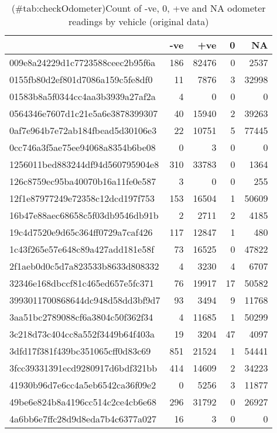 \documentclass[]{article}
\begin{document}
\begin{table}[t]

\caption{(\#tab:checkOdometer)Count of -ve, 0, +ve and NA odometer readings by vehicle (original data)}
\centering
\begin{tabular}{l|r|r|r|r}
\hline
  & -ve & +ve & 0 & NA\\
\hline
009e8a24229d1c7723588ceec2b95f6a & 186 & 82476 & 0 & 2537\\
\hline
0155fb80d2ef801d7086a159c5fe8df0 & 11 & 7876 & 3 & 32998\\
\hline
01583b8a5f0344cc4aa3b3939a27af2a & 4 & 0 & 0 & 0\\
\hline
0564346e7607d1c21e5a6e3878399307 & 40 & 15940 & 2 & 39263\\
\hline
0af7e964b7e72ab184fbead5d30106e3 & 22 & 10751 & 5 & 77445\\
\hline
0cc746a3f5ae75ee94068a8354b6be08 & 0 & 3 & 0 & 0\\
\hline
1256011bed883244df94d560795904e8 & 310 & 33783 & 0 & 1364\\
\hline
126c8759ec95ba40070b16a11fe0e587 & 3 & 0 & 0 & 255\\
\hline
12f1e87977249e72358c12dcd197f753 & 153 & 16504 & 1 & 50609\\
\hline
16b47e88aec68658c5f03db9546db91b & 2 & 2711 & 2 & 4185\\
\hline
19c4d7520e9d65c364ff0729a7caf426 & 117 & 12847 & 1 & 480\\
\hline
1c43f265e57e648c89a427add181e58f & 73 & 16525 & 0 & 47822\\
\hline
2f1aeb0d0c5d7a823533b8633d808332 & 4 & 3230 & 4 & 6707\\
\hline
32346e168dbccf81c465ed657e5fc371 & 76 & 19917 & 17 & 50582\\
\hline
3993011700868644dc948d58dd3bf9d7 & 93 & 3494 & 9 & 11768\\
\hline
3aa51bc2789088cf6a3804c50f362f34 & 4 & 11685 & 1 & 50299\\
\hline
3c218d73c404cc8a552f3449b64f403a & 19 & 3204 & 47 & 4097\\
\hline
3dfd17f381f439bc351065cff0d83c69 & 851 & 21524 & 1 & 54441\\
\hline
3fcc39331391ecd9280917d6bdf321bb & 414 & 14609 & 2 & 34223\\
\hline
41930b96d7e6cc4a5eb6542ca36f09e2 & 0 & 5256 & 3 & 11877\\
\hline
49be6e824b8a4196cc514c2ce4cb6e68 & 296 & 31792 & 0 & 26927\\
\hline
4a6bb6e7ffc28d9d8eda7b4c6377a027 & 16 & 3 & 0 & 0\\

\end{tabular}
\end{table}
\end{document}
